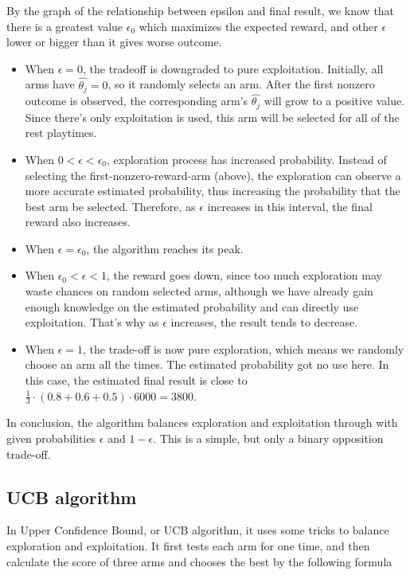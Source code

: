 \documentclass[11pt]{article}
\begin{document}
By the graph of the relationship between epsilon and final result, we
know that there is a greatest value \(\epsilon_0\) which maximizes the
expected reward, and other \(\epsilon\) lower or bigger than it gives
worse outcome.

\begin{itemize}
\item
  When \(\epsilon = 0\), the tradeoff is downgraded to pure
  exploitation. Initially, all arms have \(\hat{\theta_j} = 0\), so it
  randomly selects an arm. After the first nonzero outcome is observed,
  the corresponding arm's \(\hat{\theta_j}\) will grow to a positive
  value. Since there's only exploitation is used, this arm will be
  selected for all of the rest playtimes.
\item
  When \(0 < \epsilon < \epsilon_0\), exploration process has increased
  probability. Instead of selecting the first-nonzero-reward-arm
  (above), the exploration can observe a more accurate estimated
  probability, thus increasing the probability that the best arm be
  selected. Therefore, as \(\epsilon\) increases in this interval, the
  final reward also increases.
\item
  When \(\epsilon = \epsilon_0\), the algorithm reaches its peak.
\item
  When \(\epsilon_0 < \epsilon < 1\), the reward goes down, since too
  much exploration may waste chances on random selected arms, although
  we have already gain enough knowledge on the estimated probability and
  can directly use exploitation. That's why as \(\epsilon\) increases,
  the result tends to decrease.
\item
  When \(\epsilon = 1\), the trade-off is now pure exploration, which
  means we randomly choose an arm all the times. The estimated
  probability got no use here. In this case, the estimated final result
  is close to \(\frac{1}{3} \cdot (0.8+0.6+0.5) \cdot 6000 = 3800\).
\end{itemize}

In conclusion, the algorithm balances exploration and exploitation
through with given probabilities \(\epsilon\) and \(1- \epsilon\). This
is a simple, but only a binary opposition trade-off.
\pagebreak
    \hypertarget{ucb-algorithm}{%
\subsection{UCB algorithm}\label{ucb-algorithm}}

In Upper Confidence Bound, or UCB algorithm, it uses some tricks to
balance exploration and exploitation. It first tests each arm for one
time, and then calculate the score of three arms and chooses the best by
the following formula
\end{document}
